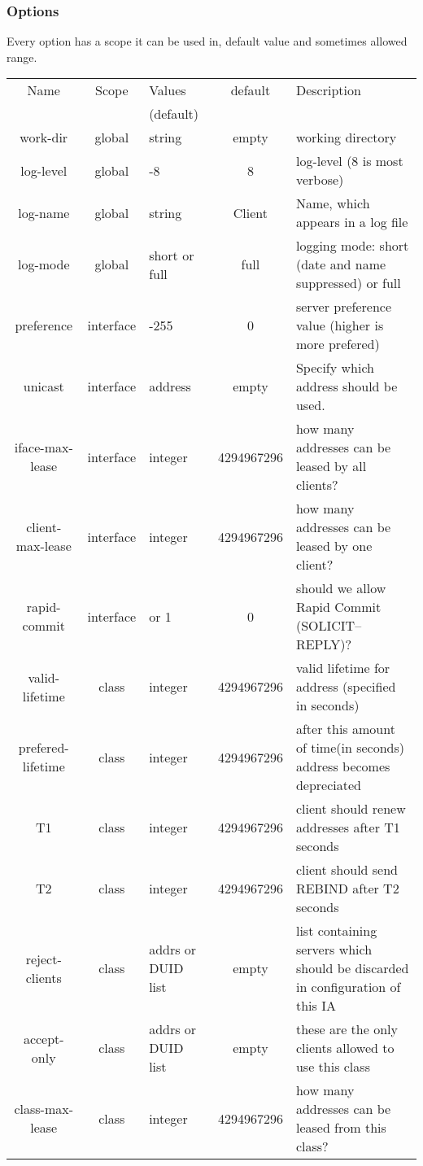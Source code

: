 \subsubsection{Options}

Every option has a scope it can be used in, default value and
sometimes allowed range.

\begin{tabular}{|c|c|>{\centering}p{1.7cm}<{}|c|p{6cm}|}
\hline
Name             & Scope   & Values      & default    & Description \\
                 &         & (default)   &  & \\
\hline
work-dir         & global  & string      & empty      & working directory \\
log-level        & global  & 1-8         & 8          & log-level (8 is most verbose) \\
log-name         & global  & string      & Client     & Name, which appears in a log file\\
log-mode         & global  &short or full& full       & logging mode: short (date and name suppressed) or full \\

preference       &interface& 0-255       & 0          & server preference value (higher is more prefered) \\
unicast          &interface& address     & empty      & Specify which address should be used. \\
iface-max-lease  &interface& integer     & 4294967296 & how many addresses can be leased by all clients? \\
client-max-lease &interface& integer     & 4294967296 & how many addresses can be leased by one client? \\
rapid-commit     &interface& 0 or 1      & 0          & should we allow Rapid Commit (SOLICIT--REPLY)? \\

valid-lifetime   & class   & integer     & 4294967296 & valid lifetime for address (specified in seconds)\\
prefered-lifetime& class   & integer     & 4294967296 & after this amount of time(in seconds) address becomes depreciated\\
T1               & class   & integer     & 4294967296 & client should renew addresses after T1 seconds \\
T2               & class   & integer     & 4294967296 & client should send REBIND after T2 seconds\\
reject-clients   & class   & addrs or 
                             DUID list   & empty      & list containing servers which should be discarded in configuration of this IA \\
accept-only      & class   & addrs or
                             DUID list   & empty      & these are the only clients allowed to use this class\\
class-max-lease  & class   & integer     & 4294967296 & how many addresses can be leased from this class? \\
\hline
\end{tabular}

